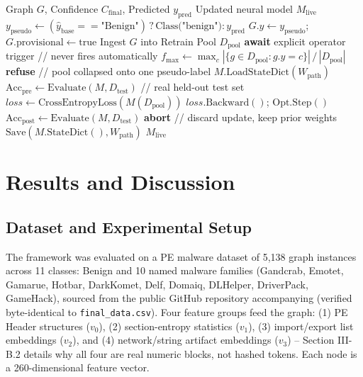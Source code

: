 \documentclass[conference]{IEEEtran}
\newcommand{\DatasetTotal}{5,138}   %
\newcommand{\GateTau}{0.68}
\begin{document}
\begin{algorithm}[htbp]
\caption{Zero-Day Self-Healing Transfer Learning (Agent 2)}
\label{alg:agent2}
\begin{algorithmic}[1]
\REQUIRE Graph $G$, Confidence $C_{\text{final}}$, Predicted $y_{\text{pred}}$
\ENSURE Updated neural model $M_{\text{live}}$
\IF{$C_{\text{final}} < \GateTau$}
    \STATE $y_{\text{pseudo}} \leftarrow (\hat{y}_{\text{base}} == \text{"Benign"}) \,?\, \text{Class("benign")} : y_{\text{pred}}$
    \STATE $G.y \leftarrow y_{\text{pseudo}}$; \ \ $G.\text{provisional} \leftarrow \text{true}$
    \STATE Ingest $G$ into Retrain Pool $D_{\text{pool}}$
\ENDIF
\STATE \textbf{await} explicit operator trigger \quad // never fires automatically
\STATE $f_{\max} \leftarrow \max_c |\{g \in D_{\text{pool}} : g.y {=} c\}| \,/\, |D_{\text{pool}}|$
    \STATE \textbf{refuse} \quad // pool collapsed onto one pseudo-label
\ENDIF
\STATE $M.\text{LoadStateDict}(W_{\text{path}})$
\STATE $\text{Acc}_{\text{pre}} \leftarrow \text{Evaluate}(M, D_{\text{test}})$ \quad // real held-out test set
    \STATE $loss \leftarrow \text{CrossEntropyLoss}(M(D_{\text{pool}}))$
    \STATE $loss.\text{Backward}()$; $\text{Opt.Step}()$
\ENDFOR
\STATE $\text{Acc}_{\text{post}} \leftarrow \text{Evaluate}(M, D_{\text{test}})$
    \STATE \textbf{abort} \quad // discard update, keep prior weights
\ELSE
    \STATE $\text{Save}(M.\text{StateDict}(), W_{\text{path}})$
\ENDIF
\RETURN $M_{\text{live}}$
\end{algorithmic}
\end{algorithm}

\section{Results and Discussion}

\subsection{Dataset and Experimental Setup}
The framework was evaluated on a PE malware dataset of \DatasetTotal{} graph instances across 11 classes: Benign and 10 named malware families (Gandcrab, Emotet, Gamarue, Hotbar, DarkKomet, Delf, Domaiq, DLHelper, DriverPack, GameHack), sourced from the public GitHub repository accompanying \cite{b19} (verified byte-identical to \texttt{final\_data.csv}). Four feature groups feed the graph: (1) PE Header structures ($v_0$), (2) section-entropy statistics ($v_1$), (3) import/export list embeddings ($v_2$), and (4) network/string artifact embeddings ($v_3$) -- Section III-B.2 details why all four are real numeric blocks, not hashed tokens. Each node is a 260-dimensional feature vector.
\end{document}
